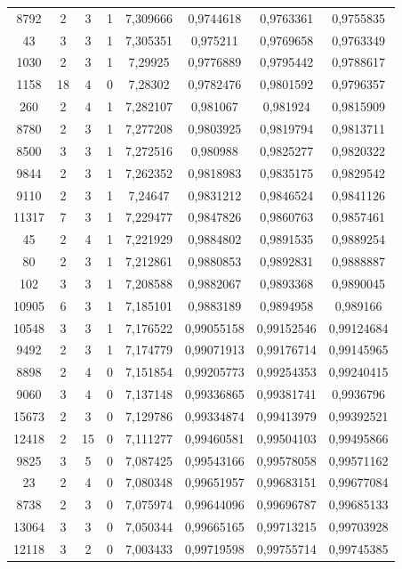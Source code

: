 \begin{longtable}{|c|c|c|c|c|c|c|c|}
8792 & 2 & 3 & 1 & 7,309666 & 0,9744618 & 0,9763361 & 0,9755835 \\
43 & 3 & 3 & 1 & 7,305351 & 0,975211 & 0,9769658 & 0,9763349 \\
1030 & 2 & 3 & 1 & 7,29925 & 0,9776889 & 0,9795442 & 0,9788617 \\
1158 & 18 & 4 & 0 & 7,28302 & 0,9782476 & 0,9801592 & 0,9796357 \\
260 & 2 & 4 & 1 & 7,282107 & 0,981067 & 0,981924 & 0,9815909 \\
8780 & 2 & 3 & 1 & 7,277208 & 0,9803925 & 0,9819794 & 0,9813711 \\
8500 & 3 & 3 & 1 & 7,272516 & 0,980988 & 0,9825277 & 0,9820322 \\
9844 & 2 & 3 & 1 & 7,262352 & 0,9818983 & 0,9835175 & 0,9829542 \\
9110 & 2 & 3 & 1 & 7,24647 & 0,9831212 & 0,9846524 & 0,9841126 \\
11317 & 7 & 3 & 1 & 7,229477 & 0,9847826 & 0,9860763 & 0,9857461 \\
45 & 2 & 4 & 1 & 7,221929 & 0,9884802 & 0,9891535 & 0,9889254 \\
80 & 2 & 3 & 1 & 7,212861 & 0,9880853 & 0,9892831 & 0,9888887 \\
102 & 3 & 3 & 1 & 7,208588 & 0,9882067 & 0,9893368 & 0,9890045 \\
10905 & 6 & 3 & 1 & 7,185101 & 0,9883189 & 0,9894958 & 0,989166 \\
10548 & 3 & 3 & 1 & 7,176522 & 0,99055158 & 0,99152546 & 0,99124684 \\
9492 & 2 & 3 & 1 & 7,174779 & 0,99071913 & 0,99176714 & 0,99145965 \\
8898 & 2 & 4 & 0 & 7,151854 & 0,99205773 & 0,99254353 & 0,99240415 \\
9060 & 3 & 4 & 0 & 7,137148 & 0,99336865 & 0,99381741 & 0,9936796 \\
15673 & 2 & 3 & 0 & 7,129786 & 0,99334874 & 0,99413979 & 0,99392521 \\
12418 & 2 & 15 & 0 & 7,111277 & 0,99460581 & 0,99504103 & 0,99495866 \\
9825 & 3 & 5 & 0 & 7,087425 & 0,99543166 & 0,99578058 & 0,99571162 \\
23 & 2 & 4 & 0 & 7,080348 & 0,99651957 & 0,99683151 & 0,99677084 \\
8738 & 2 & 3 & 0 & 7,075974 & 0,99644096 & 0,99696787 & 0,99685133 \\
13064 & 3 & 3 & 0 & 7,050344 & 0,99665165 & 0,99713215 & 0,99703928 \\
12118 & 3 & 2 & 0 & 7,003433 & 0,99719598 & 0,99755714 & 0,99745385 \\

\end{longtable}
